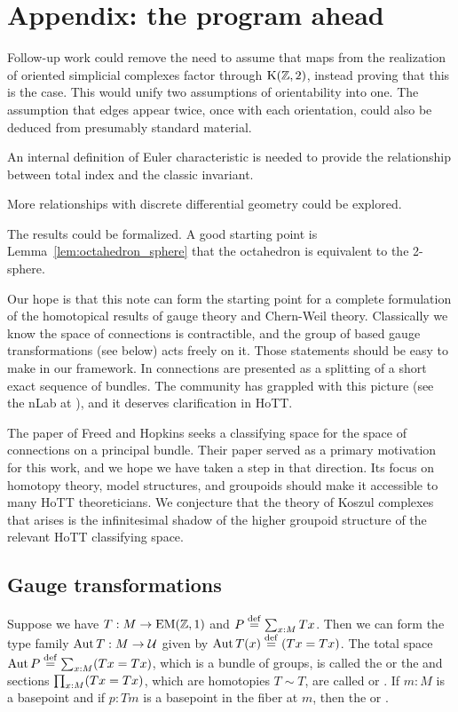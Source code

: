 \section{Appendix: the program ahead}

Follow-up work could remove the need to assume that maps from the realization of oriented simplicial complexes factor through \( \mathrm{K}(\mathbb{Z},2) \), instead proving that this is the case. This would unify two assumptions of orientability into one. The assumption that edges appear twice, once with each orientation, could also be deduced from presumably standard material.

An internal definition of Euler characteristic is needed to provide the relationship between total index and the classic invariant.

More relationships with discrete differential geometry\cite{crane_ddg}\cite{crane_connections} could be explored.

The results could be formalized. A good starting point is Lemma~\ref{lem:octahedron_sphere} that the octahedron is equivalent to the 2-sphere.

Our hope is that this note can form the starting point for a complete formulation of the homotopical results of gauge theory and Chern-Weil theory. Classically we know the space of connections is contractible, and the group of based gauge transformations (see below) acts freely on it. Those statements should be easy to make in our framework. In \cite{atiyah1983yang} connections are presented as a splitting of a short exact sequence of bundles. The community has grappled with this picture (see the nLab at \cite{urs_atiyah}), and it deserves clarification in HoTT.

The paper of Freed and Hopkins\cite{freed2013chernweil} seeks a classifying space for the space of connections on a principal bundle. Their paper served as a primary motivation for this work, and we hope we have taken a step in that direction. Its focus on homotopy theory, model structures, and groupoids should make it accessible to many HoTT theoreticians. We conjecture that the theory of Koszul complexes that arises is the infinitesimal shadow of the higher groupoid structure of the relevant HoTT classifying space.

\subsection{Gauge transformations}
\begin{mydef}
\label{sec:automorphisms}
Suppose we have \( T:M\to\mathrm{EM}(\mathbb{Z},1) \) and \( P\stackrel{\mathrm{def}}{=}\sum_{x:M}Tx \). Then we can form the type family \( \operatorname{Aut} T:M\to\mathcal{U} \) given by \( \operatorname{Aut} T(x)\stackrel{\mathrm{def}}{=}(Tx=Tx) \). The total space \( \operatorname{Aut} P\stackrel{\mathrm{def}}{=}\sum_{x:M}(Tx=Tx) \), which is a bundle of groups, is called the  or the  and sections \( \prod_{x:M}(Tx=Tx) \), which are homotopies \( T\sim T \), are called  or . If \( m:M \) is a basepoint and if \( p:Tm \) is a basepoint in the fiber at \( m \), then the  or .
\end{mydef}

